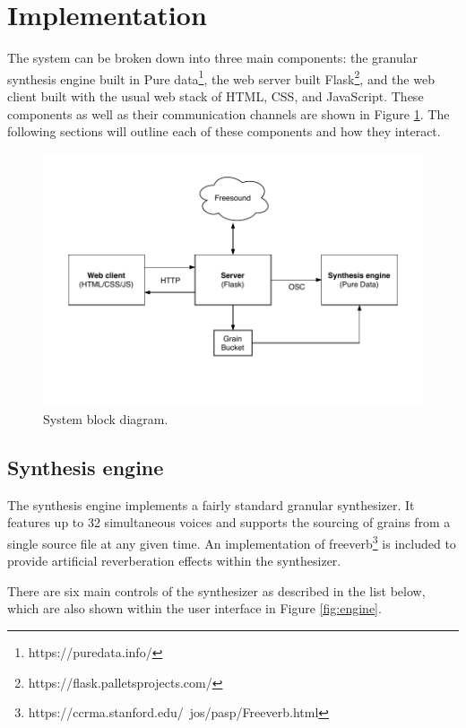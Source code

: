 \documentclass{nime-alternate}
\begin{document}
\section{Implementation}

The system can be broken down into three main components: 
the granular synthesis engine built in Pure data\footnote{https://puredata.info/}, 
the web server built Flask\footnote{https://flask.palletsprojects.com/}, 
and the web client built with the usual web stack of HTML, CSS, and JavaScript. 
These components as well as their communication channels are shown in Figure \ref{fig:block-diagram}.
The following sections will outline each of these components and how they interact. 

\begin{figure}[h] \label{fig:block-diagram}
	\includegraphics[width=\linewidth]{../img/granabular-system.pdf}
	\caption{System block diagram.}
	\centering
\end{figure}

\subsection{Synthesis engine}

The synthesis engine implements a fairly standard granular synthesizer. 
It features up to 32 simultaneous voices and supports the sourcing of grains
from a single source file at any given time. 
An implementation of freeverb\footnote{https://ccrma.stanford.edu/~jos/pasp/Freeverb.html} 
is included to provide artificial reverberation effects within the synthesizer. 

There are six main controls of the synthesizer as described in the list below, 
which are also shown within the user interface in Figure \ref{fig:engine}.
\end{document}
